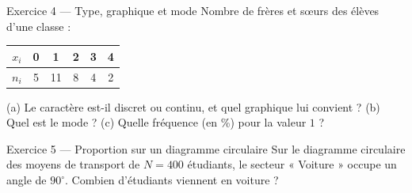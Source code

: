 \documentclass[11pt,a4paper]{article}
\begin{document}
\begin{exobox}{Exercice 4 — Type, graphique et mode}
Nombre de frères et sœurs des élèves d'une classe :
\begin{center}
\begin{tabular}{|c|c|c|c|c|c|}
\hline
$x_i$ & 0 & 1 & 2 & 3 & 4 \\\hline
$n_i$ & 5 & 11 & 8 & 4 & 2 \\\hline
\end{tabular}
\end{center}
(a) Le caractère est-il discret ou continu, et quel graphique lui convient ?
(b) Quel est le mode ? (c) Quelle fréquence (en \%) pour la valeur $1$ ?
\end{exobox}

\begin{exobox}{Exercice 5 — Proportion sur un diagramme circulaire}
Sur le diagramme circulaire des moyens de transport de $N=400$ étudiants, le secteur « Voiture »
occupe un angle de $90^\circ$. Combien d'étudiants viennent en voiture ?
\end{exobox}
\end{document}
